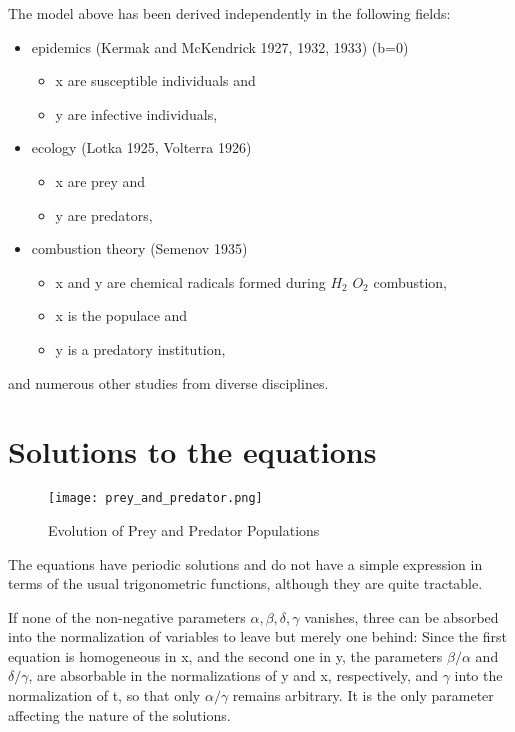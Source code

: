 \documentclass{article}
\begin{document}
The model above has been derived independently in the following fields:

\begin{itemize}
\item epidemics (Kermak and McKendrick 1927, 1932, 1933) (b=0)
\begin{itemize}
\item x are susceptible individuals and
\item y are infective individuals,
\end{itemize}

\item ecology (Lotka 1925, Volterra 1926)

\begin{itemize}
\item x are prey and
\item y are predators,
\end{itemize}
\item combustion theory (Semenov 1935)
\begin{itemize}
\item x and y are chemical radicals formed during $H_2$ $O_2$ combustion,
\end{itemize}
\begin{itemize}
\item x is the populace and
\item y is a predatory institution,
\end{itemize}
\end{itemize}

and numerous other studies from diverse disciplines.

\section{Solutions to the equations}

\begin{figure}[h]
\begin{center}
\texttt{[image: prey\_and\_predator.png]}
\caption{Evolution of Prey and Predator Populations}\label{fig:1}
\end{center}
\end{figure}

The equations have periodic solutions and do not have a simple expression in terms of the usual trigonometric functions, although they are quite tractable.

If none of the non-negative parameters $\alpha, \beta, \delta,  \gamma$ vanishes, three can be absorbed into the normalization of variables to leave but merely one behind: Since the first equation is homogeneous in x, and the second one in y, the parameters $\beta / \alpha$ and $\delta / \gamma$, are absorbable in the normalizations of y and x, respectively, and $\gamma$ into the normalization of t, so that only $\alpha / \gamma$ remains arbitrary. It is the only parameter affecting the nature of the solutions.
\end{document}
